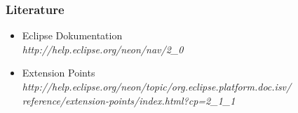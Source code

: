 {\begin{frame}
	\frametitle{Literature}
	\begin{itemize}
		\item Eclipse Dokumentation \\  \textit{http://help.eclipse.org/neon/nav/2\_0}
		\item Extension Points  \\\textit{http://help.eclipse.org/neon/topic/org.eclipse.platform.doc.isv/\\reference/extension-points/index.html?cp=2\_1\_1}
	\end{itemize}
%
\end{frame}


}